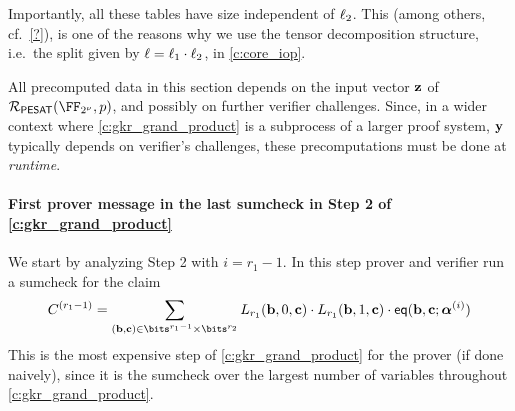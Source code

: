 \documentclass[11pt,letterpaper,usenames,dvipsnames]{article}
\begin{document}

Importantly, all these tables have size independent of $\ell_2$.  This (among others, cf.\ \cref{?}), is one of the reasons why we use the tensor decomposition structure, i.e.\ the split given by $\ell=\ell_1\cdot \ell_2$, in \cref{c:core_iop}.

\begin{remark}
    All precomputed data in this section depends on the input vector $\mathbf{z}$ of $\PESAT(\comfield,\gkrpol)$, and possibly on further verifier challenges. Since, in a wider context where \cref{c:gkr_grand_product} is a subprocess of a larger proof system, $\mathbf{y}$ typically depends on verifier's challenges, these precomputations must be done at \emph{runtime}. 
\end{remark}



\paragraph{First prover message in the last sumcheck in Step 2 of \cref{c:gkr_grand_product}}
We start by analyzing Step 2 with $i=r_1-1$. In this step prover and verifier run a sumcheck for the claim
%
$$
C^{(r_1-1)}= \sum_{(\bb,\cc)\in \bits^{r_1-1}\times \bits^{r_2}} L_{r_1}(\bb,0,\cc) \cdot L_{r_1}(\bb,1,\cc) \cdot \eq(\bb,\cc;\bm{\alpha}^{(i)})
$$
%
This is the most expensive step of \cref{c:gkr_grand_product} for the prover (if done naively), since it is the sumcheck over the largest number of variables throughout \cref{c:gkr_grand_product}. 
\end{document}
